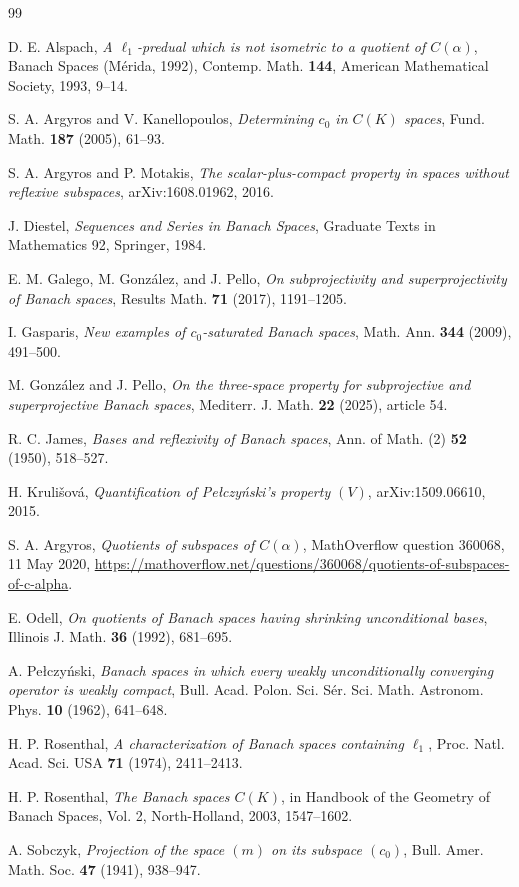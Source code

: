 \documentclass[11pt]{article}
\theoremstyle{definition}
\begin{document}
\begin{thebibliography}{99}

D. E. Alspach,
\emph{A $\ell_1$-predual which is not isometric to a quotient of
$C(\alpha)$},
Banach Spaces (M\'erida, 1992), Contemp. Math. \textbf{144},
American Mathematical Society, 1993, 9--14.

S. A. Argyros and V. Kanellopoulos,
\emph{Determining $c_0$ in $C(K)$ spaces},
Fund. Math. \textbf{187} (2005), 61--93.

S. A. Argyros and P. Motakis,
\emph{The scalar-plus-compact property in spaces without reflexive
subspaces},
arXiv:1608.01962, 2016.

J. Diestel,
\emph{Sequences and Series in Banach Spaces},
Graduate Texts in Mathematics 92, Springer, 1984.

E. M. Galego, M. Gonz\'alez, and J. Pello,
\emph{On subprojectivity and superprojectivity of Banach spaces},
Results Math. \textbf{71} (2017), 1191--1205.

I. Gasparis,
\emph{New examples of $c_0$-saturated Banach spaces},
Math. Ann. \textbf{344} (2009), 491--500.

M. Gonz\'alez and J. Pello,
\emph{On the three-space property for subprojective and superprojective
Banach spaces},
Mediterr. J. Math. \textbf{22} (2025), article 54.

R. C. James,
\emph{Bases and reflexivity of Banach spaces},
Ann. of Math. (2) \textbf{52} (1950), 518--527.

H. Kruli\v{s}ov\'a,
\emph{Quantification of Pe\l czy\'nski's property $(V)$},
arXiv:1509.06610, 2015.

S. A. Argyros,
\emph{Quotients of subspaces of $C(\alpha)$},
MathOverflow question 360068, 11 May 2020,
\url{https://mathoverflow.net/questions/360068/quotients-of-subspaces-of-c-alpha}.

E. Odell,
\emph{On quotients of Banach spaces having shrinking unconditional bases},
Illinois J. Math. \textbf{36} (1992), 681--695.

A. Pe\l czy\'nski,
\emph{Banach spaces in which every weakly unconditionally converging
operator is weakly compact},
Bull. Acad. Polon. Sci. S\'er. Sci. Math. Astronom. Phys. \textbf{10}
(1962), 641--648.

H. P. Rosenthal,
\emph{A characterization of Banach spaces containing $\ell_1$},
Proc. Natl. Acad. Sci. USA \textbf{71} (1974), 2411--2413.

H. P. Rosenthal,
\emph{The Banach spaces $C(K)$},
in Handbook of the Geometry of Banach Spaces, Vol. 2,
North-Holland, 2003, 1547--1602.

A. Sobczyk,
\emph{Projection of the space $(m)$ on its subspace $(c_0)$},
Bull. Amer. Math. Soc. \textbf{47} (1941), 938--947.

\end{thebibliography}
\end{document}
